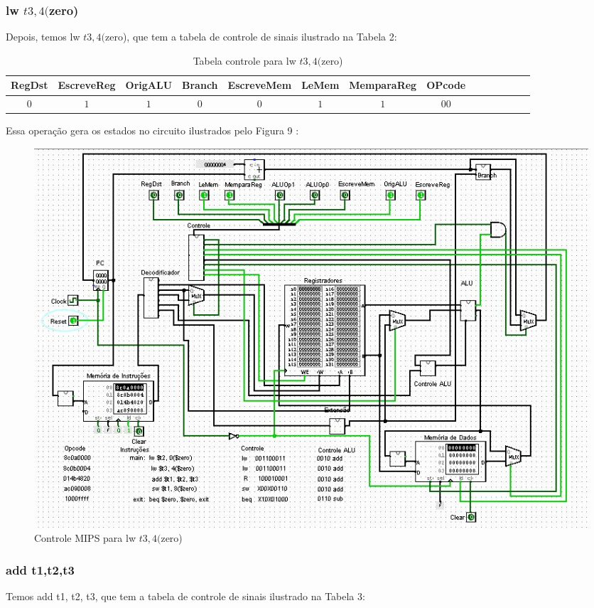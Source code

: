 \documentclass[
	article,
	11pt,
	oneside,
	a4paper,
	english,
	brazil,
	]{abntex2}
\begin{document}
\subsubsection{lw $t3,4($zero)}
Depois, temos lw $t3,4($zero), que tem a tabela de controle de sinais ilustrado na Tabela 2:

\begin{table}[h!]
  \centering
  \begin{adjustbox}{max width=\textwidth}
  \begin{tabular}{*{14}{|c}|}%
  \hline
  RegDst & EscreveReg &OrigALU & Branch & EscreveMem & LeMem & MemparaReg & OPcode\\
  \hline
  \hline
  $0$ & $1$ & $1$ & $0$ & $0$ & $1$ & $1$ &
  $00$ \\
  \hline
\end{tabular}
\end{adjustbox}
  \caption{Tabela controle para lw $t3,4($zero)}
  \label{tab:label_test}
\end{table}

Essa operação gera os estados no circuito ilustrados pelo Figura 9 : 

        \begin{figure}[!htb]
        \centering
        \includegraphics[scale=0.5]{imagens/teste_1.JPG}
        \caption{Controle MIPS para lw $t3,4($zero)}
        \label{fig:hostnetid}
        \end{figure}
        
\subsubsection{add t1,t2,t3}
Temos add t1, t2, t3, que tem a tabela de controle de sinais ilustrado na Tabela 3:
\end{document}
